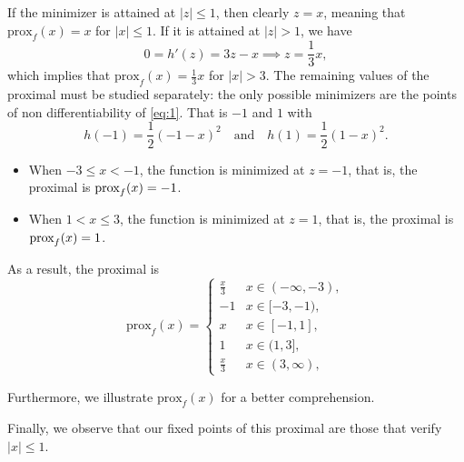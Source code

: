 \documentclass[12pt]{scrartcl}
\begin{document}
If the minimizer is attained at $|z| \leq 1$, then clearly $z = x$, meaning that $\mbox{prox}_f(x) = x$ for $|x| \leq 1$. If it is attained at $|z| > 1$, we have
\[
    0 = h'(z) = 3z - x \implies z = \frac 1 3 x,  
\]
which implies that $\mbox{prox}_f (x)= \frac 1 3 x$ for $|x| > 3$. The remaining values of the proximal must be studied separately: the only possible minimizers are the points of non differentiability of \eqref{eq:1}. That is $-1$ and $1$ with 
\[
    h(-1) = \frac 1 2 (-1 -x)^2 \quad \text{and} \quad h(1) = \frac 1 2 (1-x)^2.  
\]
\begin{itemize}
    \item When $-3 \leq x < -1$, the function is minimized at $z = -1$, that is, the proximal is $\hbox{prox}_f(x) = -1$.
    \item When $1 < x \leq 3$, the function is minimized at $z = 1$, that is, the proximal is $\hbox{prox}_f(x) = 1$.
\end{itemize}
As a result, the proximal is
\[
    \mbox{prox}_f (x) = 
    \begin{cases}
        \frac x 3 & x \in  (-\infty, -3), \\
        -1 & x \in [-3,-1), \\
        x &  x \in [-1, 1],\\
        1 & x \in (1,3], \\
        \frac x 3 & x \in  (3, \infty),
    \end{cases}
\]

\vspace{0.5em}

Furthermore, we illustrate $\mbox{prox}_f (x)$ for a better comprehension.

\begin{figure}[H]
    \centering
\end{figure}

Finally, we observe that our fixed points of this proximal are those that verify $|x|\leq 1$.
\end{document}
